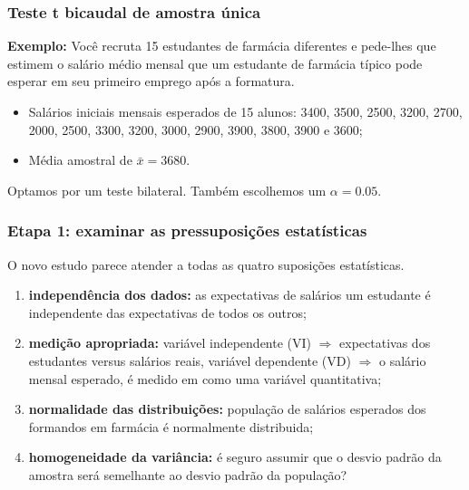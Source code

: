 \documentclass[11pt]{beamer}
\begin{document}
\begin{frame}
\frametitle{Teste t bicaudal de amostra única}

\textbf{Exemplo:} Você recruta 15 estudantes de farmácia diferentes e pede-lhes que estimem o salário médio mensal que um estudante de farmácia típico pode esperar em seu primeiro emprego após a formatura.
\begin{itemize}
\item
   Salários iniciais mensais esperados de 15 alunos: 3400, 3500, 2500, 3200, 2700, 2000, 2500, 3300, 3200, 3000, 2900, 3900, 3800, 3900 e 3600;
\item
  Média amostral de $\bar{x} = 3680$.
\end{itemize}

Optamos por um teste bilateral. Também escolhemos um \(\alpha=0.05\).

\end{frame}



\begin{frame}
\frametitle{Etapa 1: examinar as pressuposições estatísticas}

O novo estudo parece atender a todas as quatro suposições estatísticas.

\begin{enumerate}
\item \textbf{independência dos dados:} as expectativas de salários um estudante é independente das expectativas de todos os outros;
\item \textbf{medição apropriada:} variável independente (VI) \(\Rightarrow\) expectativas dos estudantes versus salários reais, variável dependente (VD) \(\Rightarrow\) o salário mensal esperado, é medido em como uma variável quantitativa;
\item \textbf{normalidade das distribuições:} população de salários esperados dos formandos em farmácia é normalmente distribuida;
\item \textbf{homogeneidade da variância:} é seguro assumir que o desvio padrão da amostra será semelhante ao desvio padrão da população?
\end{enumerate}

\end{frame}
\end{document}
